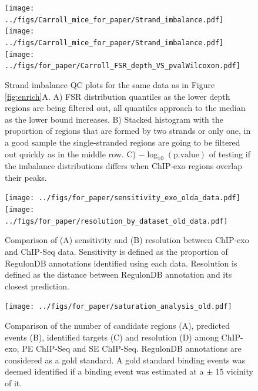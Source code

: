 \documentclass{bmcart}\usepackage[]{graphicx}\usepackage[]{color}
\begin{document}
\newpage

\begin{figure}[h!]
  \centering  
  \texttt{[image: ../figs/Carroll\_mice\_for\_paper/Strand\_imbalance.pdf]} 
  \newline
  \texttt{[image: ../figs/Carroll\_mice\_for\_paper/Strand\_imbalance.pdf]} 
  \texttt{[image: ../figs/for\_paper/Carroll\_FSR\_depth\_VS\_pvalWilcoxon.pdf]}
  \caption{Strand imbalance QC plots for the same data as in Figure
    \ref{fig:enrich}A. A) FSR distribution quantiles as the lower
    depth regions are being filtered out, all quantiles approach to
    the median as the lower bound increases. B) Stacked histogram with
    the proportion of regions that are formed by two strands or only
    one, in a good sample the single-stranded regions are going to be
    filtered out quickly as in the middle row. C)
    $-\log_{10}(\text{p.value})$ of testing if the imbalance
    distributions differs when ChIP-exo regions overlap their peaks.}
  \label{fig:strand}
\end{figure}

\newpage

\begin{figure}[h!]
  \centering
  \texttt{[image: ../figs/for\_paper/sensitivity\_exo\_olda\_data.pdf]}
  \texttt{[image: ../figs/for\_paper/resolution\_by\_dataset\_old\_data.pdf]}
   \caption{Comparison of (A) sensitivity and (B) resolution between
     ChIP-exo and ChIP-Seq data. Sensitivity is defined as the
     proportion of RegulonDB annotations identified using each
     data. Resolution is defined as the distance between RegulonDB
     annotation and its closest prediction.}
  \label{fig:reso_all}
\end{figure}

\newpage

\begin{figure}[h]
  \centering
  \texttt{[image: ../figs/for\_paper/saturation\_analysis\_old.pdf]}
  \caption{Comparison of the number of candidate regions (A),
    predicted events (B), identified targets (C) and resolution (D)
    among ChIP-exo, PE ChIP-Seq and SE ChIP-Seq. RegulonDB annotations
    are considered as a gold standard. A gold standard binding events
    was deemed identified if a binding event was estimated at a $\pm$
    15 vicinity of it.}
  \label{fig:design}
\end{figure}


 \newpage
\end{document}
